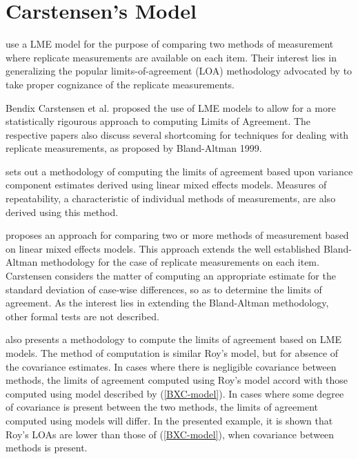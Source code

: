 \documentclass[12pt, a4paper]{report}
\theoremstyle{plain}
\theoremstyle{definition}
\theoremstyle{remark}
\begin{document}
\section{Carstensen's Model}


\citet{BXC2008} use a LME model for the purpose of comparing two methods of measurement where replicate measurements are available on each item. Their interest lies in generalizing the popular limits-of-agreement (LOA) methodology advocated by \citet{BA86} to take proper cognizance of the replicate measurements. 


Bendix Carstensen et al. proposed the use of LME models to allow for a more statistically rigourous approach to computing Limits of Agreement.  The respective papers also discuss several shortcoming for techniques for dealing with replicate measurements, as proposed by Bland-Altman 1999.


\citet{BXC2008} sets out a methodology of computing the limits of
agreement based upon variance component estimates derived using linear mixed effects models. Measures of repeatability, a characteristic of individual methods of measurements, are also derived using this method.

\citet{BXC2008} proposes an approach for comparing two or more methods of measurement based on linear mixed effects models. This approach extends the well established Bland-Altman methodology for the case of replicate measurements on each item. Carstensen considers the matter of computing an appropriate estimate for the standard deviation of case-wise differences, so as to determine the limits of agreement. As the interest lies in extending the Bland-Altman methodology, other formal tests are not described.

\citet{BXC2008} also presents a methodology to compute the limits of agreement based on LME models. The method of computation is similar Roy's model, but for absence of the covariance estimates. In cases where there is negligible covariance between methods, the limits of agreement computed using Roy's model accord with those computed using model described by (\ref{BXC-model}). In cases where some degree of covariance is present between the two methods, the limits of agreement computed using models will differ. In the presented example, it is shown that Roy's LOAs are lower than those of (\ref{BXC-model}), when covariance between methods is present.
\end{document}
